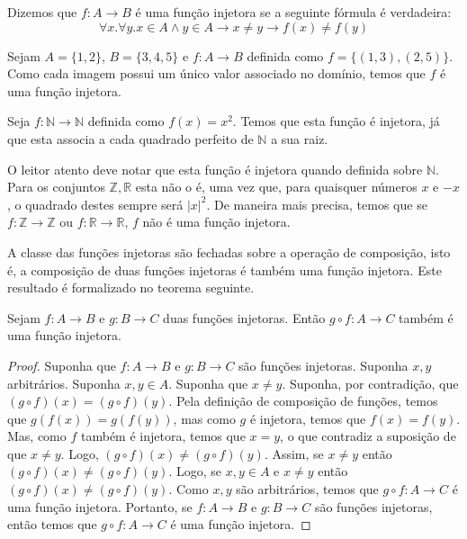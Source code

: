 \begin{Definition}
Dizemos que $f : A \to B$ é uma função injetora se a seguinte fórmula
é verdadeira:
\[
\forall x. \forall y. x\in A \land y \in A \to x \neq y \to f (x) \neq f(y)
\]
\end{Definition}

\begin{Example}
Sejam $A = \{1,2\}$, $B =\{3,4,5\}$ e $f : A \to B$ definida como $f =
\{(1,3),(2,5)\}$. Como cada imagem possui um único valor associado no
domínio, temos que $f$ é uma função injetora.
\end{Example}
\begin{Example}
Seja $f : \mathbb{N} \to \mathbb{N}$ definida como $f(x) = x^2$. Temos
que esta função é injetora, já que esta associa a cada quadrado
perfeito de $\mathbb{N}$ a sua raiz.
\end{Example}

O leitor atento deve notar que esta função é injetora quando definida
sobre $\mathbb{N}$. Para os conjuntos $\mathbb{Z},\mathbb{R}$ esta não
o é, uma vez que, para quaisquer números $x$ e $-x$, o quadrado destes
sempre será $|x|^2$. De maneira mais precisa, temos que se $f :
\mathbb{Z} \to \mathbb{Z}$ ou $f : \mathbb{R}\to\mathbb{R}$, $f$ não é
uma função injetora.

A classe das funções injetoras são fechadas sobre a operação de
composição, isto é, a composição de duas funções injetoras é também
uma função injetora. Este resultado é formalizado no teorema seguinte.

\begin{Theorem}
Sejam $f : A \to B$ e $g : B \to C$ duas funções injetoras. Então $g
\circ f : A \to C$ também é uma função injetora.
\end{Theorem}
\begin{proof}
Suponha que $f : A \to B$ e $g : B \to C$ são funções
injetoras. Suponha $x,y$ arbitrários. Suponha $x,y \in A$. Suponha que
$x \neq y$. Suponha, por contradição, que $(g \circ f)(x) = (g\circ
f)(y)$. Pela definição de composição de funções, temos que $g(f(x)) =
g (f(y))$, mas como $g$ é injetora, temos que $f(x) = f(y)$. Mas, como
$f$ também é injetora, temos que $x = y$,  o que contradiz a suposição
de que $x \neq y$. Logo, $(g \circ f)(x) \neq (g \circ f)(y)$. Assim,
se $x\neq y$ então $(g \circ f)(x) \neq (g \circ f)(y)$. Logo, se $x,y
\in A$ e $x\neq y$ então $(g \circ f)(x) \neq (g \circ f)(y)$. Como
$x,y$ são arbitrários, temos que $g \circ f : A \to C$ é uma função
injetora. Portanto, se $f : A \to B$ e $g : B \to C$ são funções
injetoras, então temos que $g \circ f : A \to C$ é uma função injetora.
\end{proof}

